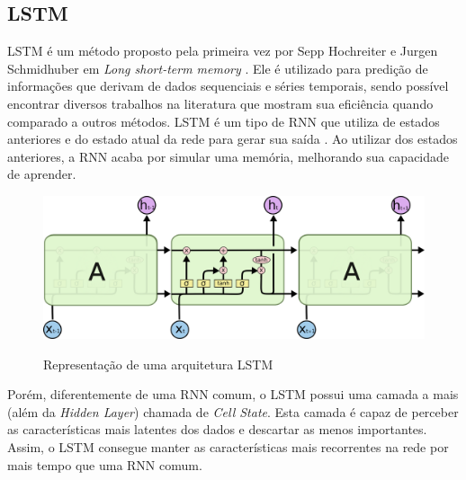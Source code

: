 \subsection{\acrfull{LSTM}}


\acrshort{LSTM} é um método proposto pela primeira vez por Sepp Hochreiter e Jurgen Schmidhuber em \textit{Long short-term memory} \cite{doi:10.1162/neco.1997.9.8.1735}. Ele é utilizado para predição de informações que derivam de dados sequenciais e séries temporais, sendo possível encontrar diversos trabalhos na literatura que mostram sua eficiência quando comparado a outros métodos. \acrshort{LSTM} é um tipo de \acrshort{RNN} que utiliza de estados anteriores e do estado atual da rede para gerar sua saída \cite{Xiaolei_2015, Zainab_2018}. Ao utilizar dos estados anteriores, a \acrshort{RNN} acaba por simular uma memória, melhorando sua capacidade de aprender. 

\begin{figure}[htbp]
    \centering
    \includegraphics[scale=0.4]{monography/img/models/lstm3.png}
    \label{figure:lstm}
    \caption[Representação de uma arquitetura LSTM]{Representação de uma arquitetura LSTM\footnotemark}
\end{figure}


Porém, diferentemente de uma \acrshort{RNN} comum, o LSTM possui uma camada a mais (além da \textit{Hidden Layer}) chamada de \textit{Cell State}. Esta camada é capaz de perceber as características mais latentes dos dados e descartar as menos importantes. Assim, o \acrshort{LSTM} consegue manter as características mais recorrentes na rede por mais tempo que uma \acrshort{RNN} comum. 

